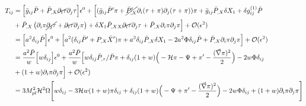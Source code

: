 \documentclass[a4paper,11pt]{article}
\begin{document}
\begin{align} \label{Tij}
T_{i j} &
= \Big[ \bar{g}_{i j} \bar{P} 
+
 \bar{P}_{,X} \cancel{ \partial_{i} \tau}\partial_{j} \tau \Big] \epsilon ^0 
+
\Big[ ({\bar{g}_{i j}} \bar{P}' \pi+\cancel{\bar{P}'_{, X}} \partial_{i} (\tau+\pi) \partial_{j}(\tau+\pi))\pi+ \bar{g}_{i j}  \bar{P}_{,X} \delta X_1 
+
 \delta g^{(1)}_{i j} \bar{P} 
        \nonumber \\ &
 +
  \bar{P}_{,X}  \left ( \partial_{i} \pi \cancel{\partial_{j} \tau  }
  +
\cancel{  \partial_{i} \tau }\partial_{j} \pi  \right ) 
  +
   \delta X_1 \bar{P}_{,XX}   \cancel{ \partial_{i} \tau }\partial_{j} \tau  
   +
    \bar{P}_{,X}   \partial_{i} \pi \partial_{j} \pi \Big ]
+ \mathcal {O}(\epsilon^{2}) 
\nonumber \\ & 
= \Big[ a^2 \delta_{ij} \bar{P} 
 \Big] \epsilon ^0 
+
\Big[ a^2   (\delta_{ij}  \bar{P}' + P_{,X} \bar{X}' )\pi+ a^2  \delta_{ij}   \bar{P}_{,X} \delta X_1 
-
 2 a^2 \Phi \delta_{ij} \bar{P} 
     +
    \bar{P}_{,X}   \partial_{i} \pi \partial_{j} \pi \Big ] 
+ \mathcal {O}(\epsilon^{2}) 
\nonumber \\ & 
= \frac{ a^2 \bar{P}}{w}   \Big[ w \delta_{ij} 
\Big] \epsilon ^0 
+
\frac{ a^2  \bar{P}}{w} \Big[ w   \delta_{ij}  \bar{P}_{,\tau}  /\bar{P} \pi+  \delta_{ij}   (1+w)  \Big (-{\mathcal{H}} \pi-\Psi+{\pi'}- \frac{ (\vec{\nabla} \pi)^2 }{2 } \Big ) 
-
 2  w \Phi \delta_{ij} 
        \nonumber \\ &
     +
   (1+w)  \partial_{i} \pi \partial_{j} \pi \Big ] 
+ \mathcal {O}(\epsilon^{2}) 
\nonumber \\ & 
=3 M_{pl}^2 \mathcal{H}^2 \Omega    \Bigg[w \delta_{ij} -3 \mathcal{H} w (1+w)\pi \delta_{ij} 
+
 \delta_{ij}   (1+w)  \Big (-\Psi+{\pi'}- \frac{(\vec{\nabla} \pi)^2  }{2 }  \Big )
-
 2 w \Phi \delta_{ij} 
     +
   {(1+w)}  \partial_{i} \pi \partial_{j} \pi \Bigg ]
          \nonumber \\ & 
\end{align}
\end{document}

